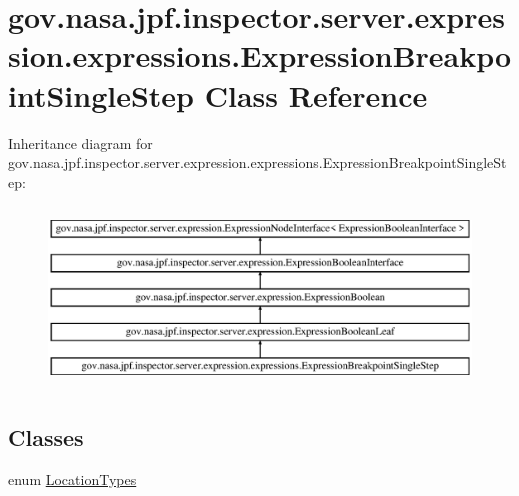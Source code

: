\hypertarget{classgov_1_1nasa_1_1jpf_1_1inspector_1_1server_1_1expression_1_1expressions_1_1_expression_breakpoint_single_step}{}\section{gov.\+nasa.\+jpf.\+inspector.\+server.\+expression.\+expressions.\+Expression\+Breakpoint\+Single\+Step Class Reference}
\label{classgov_1_1nasa_1_1jpf_1_1inspector_1_1server_1_1expression_1_1expressions_1_1_expression_breakpoint_single_step}
Inheritance diagram for gov.\+nasa.\+jpf.\+inspector.\+server.\+expression.\+expressions.\+Expression\+Breakpoint\+Single\+Step\+:\begin{figure}[H]
\begin{center}
\leavevmode
\includegraphics[height=4.827586cm]{classgov_1_1nasa_1_1jpf_1_1inspector_1_1server_1_1expression_1_1expressions_1_1_expression_breakpoint_single_step}
\end{center}
\end{figure}
\subsection*{Classes}
\begin{DoxyCompactItemize}
\item 
enum \hyperlink{enumgov_1_1nasa_1_1jpf_1_1inspector_1_1server_1_1expression_1_1expressions_1_1_expression_breakp227857a8c42509ddd72c386e68619da4}{Location\+Types}
\end{DoxyCompactItemize}
